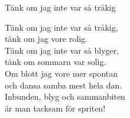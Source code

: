 \begin{song}{Tänk om jag inte var så tråkig}
	
	
	
	Tänk om jag inte var så tråkig,\\
	tänk om jag vore rolig.\\
	Tänk om jag inte var så blyger,\\
	tänk om sommarn var solig.\\
	Om blott jag vore mer spontan\\
	och dansa samba mest hela dan.\\
	Inbunden, blyg och sammanbiten\\
	är man tacksam för spriten!
	
\end{song}
